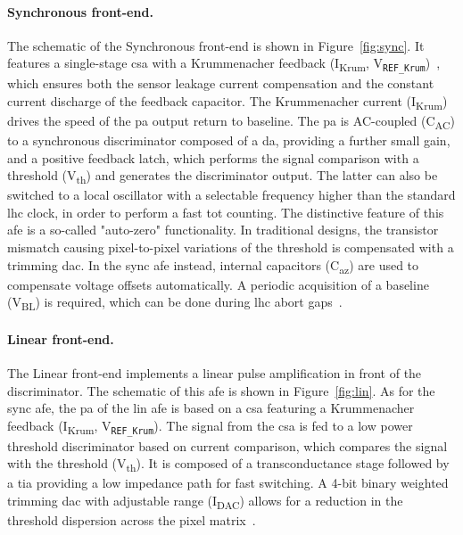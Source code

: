 \paragraph{Synchronous front-end.}
The schematic of the Synchronous front-end is shown in Figure~\ref{fig:sync}. It features a single-stage \gls{csa} with a Krummenacher feedback (I\textsubscript{Krum}, V\textsubscript{\texttt{REF\_Krum}})~\citep{krum}, which ensures both the sensor leakage current compensation and the constant current discharge of the feedback capacitor. The Krummenacher current (I\textsubscript{Krum}) drives the speed of the \gls{pa} output return to baseline.
The \gls{pa} is AC-coupled (C\textsubscript{AC}) to a synchronous discriminator composed of a \acrlong{da}, providing a further small gain, and a positive feedback latch, which performs the signal comparison with a threshold (V\textsubscript{th}) and generates the discriminator output. The latter can also be switched to a local oscillator with a selectable frequency higher than the standard \gls{lhc} clock, in order to perform a fast \gls{tot} counting.
The distinctive feature of this \gls{afe} is a so-called "auto-zero" functionality. In traditional designs, the transistor mismatch causing pixel-to-pixel variations of the threshold is compensated with a trimming \gls{dac}. In the \gls{sync} \gls{afe} instead, internal capacitors (C\textsubscript{az}) are used to compensate voltage offsets automatically. A periodic acquisition of a baseline (V\textsubscript{BL}) is required, which can be done during \gls{lhc} abort gaps~\citep{rd53a_manual, sync}. 

\paragraph{Linear front-end.}
The Linear front-end %
implements a linear pulse amplification in front of the discriminator. %
The schematic of this \gls{afe} is shown in Figure~\ref{fig:lin}. As for the \gls{sync} \gls{afe}, the \gls{pa} of the \gls{lin} \gls{afe} is based on a \gls{csa} featuring a Krummenacher feedback (I\textsubscript{Krum}, V\textsubscript{\texttt{REF\_Krum}}). The signal from the \gls{csa} is fed to a low power threshold discriminator based on current comparison, which compares the signal with the threshold (V\textsubscript{th}). It is composed of a transconductance stage followed by a \gls{tia} providing a low impedance path for fast switching. A 4-bit binary weighted trimming \gls{dac} with adjustable range (I\textsubscript{DAC}) allows for a reduction in the threshold dispersion across the pixel matrix~\citep{rd53a_manual, lin}.

